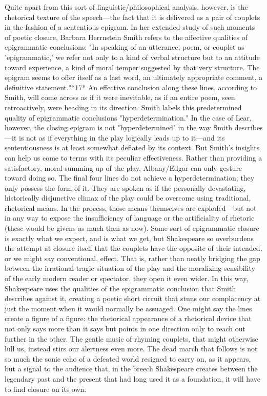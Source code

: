 	Quite apart from this sort of linguistic/philosophical analysis, however, is the rhetorical texture of the speech—the fact that it is delivered as a pair of couplets in the fashion of a sententious epigram. In her extended study of such moments of poetic closure, Barbara Herrnstein Smith refers to the affective qualities of epigrammatic conclusions: "In speaking of an utterance, poem, or couplet as 'epigrammatic,' we refer not only to a kind of verbal structure but to an attitude toward experience, a kind of moral temper suggested by that very structure. The epigram seems to offer itself as a last word, an ultimately appropriate comment, a definitive statement."*17*  An effective conclusion along these lines, according to Smith, will come across as if it were inevitable, as if an entire poem, seen retroactively, were heading in its direction. Smith labels this predetermined quality of epigrammatic conclusions "hyperdetermination." In the case of Lear, however, the closing epigram is not "hyperdetermined" in the way Smith describes—it is not as if everything in the play logically leads up to it—and its sententiousness is at least somewhat deflated by its context. But Smith's insights can help us come to terms with its peculiar effectiveness. Rather than providing a satisfactory, moral summing up of the play, Albany/Edgar can only gesture toward doing so. The final four lines do not achieve a hyperdetermination; they only possess the form of it. They are spoken as if the personally devastating, historically disjunctive climax of the play could be overcome using traditional, rhetorical means. In the process, those means themselves are exploded—but not in any way to expose the insufficiency of language or the artificiality of rhetoric (these would be givens as much then as now). Some sort of epigrammatic closure is exactly what we expect, and is what we get, but Shakespeare so overburdens the attempt at closure itself that the couplets have the opposite of their intended, or we might say conventional, effect. That is, rather than neatly bridging the gap between the irrational tragic situation of the play and the moralizing sensibility of the early modern reader or spectator, they open it even wider. In this way, Shakespeare uses the qualities of the epigrammatic conclusion that Smith describes against it, creating a poetic short circuit that stuns our complacency at just the moment when it would normally be assuaged. One might say the lines create a figure of a figure: the rhetorical appearance of a rhetorical device that not only says more than it says but points in one direction only to reach out further in the other. The gentle music of rhyming couplets, that might otherwise lull us, instead stirs our alertness even more. The dead march that follows is not so much the sonic echo of a defeated world resigned to carry on, as it appears, but a signal to the audience that, in the breech Shakespeare creates between the legendary past and the present that had long used it as a foundation, it will have to find closure on its own.
